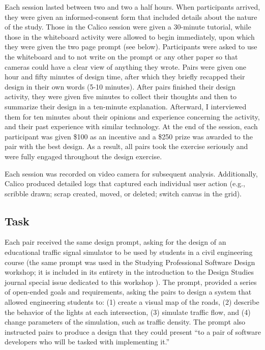 \documentclass[12pt,fleqn]{ucithesis}
\begin{document}
Each session lasted between two and two a half hours. When participants arrived, they were given an informed-consent form that included details about the nature of the study. Those in the Calico session were given a 30-minute tutorial, while those in the whiteboard activity were allowed to begin immediately, upon which they were given the two page prompt (see below). Participants were asked to use the whiteboard and to not write on the prompt or any other paper so that cameras could have a clear view of anything they wrote. Pairs were given one hour and fifty minutes of design time, after which they briefly recapped their design in their own words (5-10 minutes). After pairs finished their design activity, they were given five minutes to collect their thoughts and then to summarize their design in a ten-minute explanation. Afterward, I interviewed them for ten minutes about their opinions and experience concerning the activity, and their past experience with similar technology. At the end of the session, each participant was given \$100 as an incentive and a \$250 prize was awarded to the pair with the best design. As a result, all pairs took the exercise seriously and were fully engaged throughout the design exercise. 

Each session was recorded on video camera for subsequent analysis. Additionally, Calico produced detailed logs that captured each individual user action (e.g., scribble drawn; scrap created, moved, or deleted; switch canvas in the grid).

\subsection {Task}
\label{experimentaldesign:3}

Each pair received the same design prompt, asking for the design of an educational traffic signal simulator to be used by students in a civil engineering course (the same prompt was used in the Studying Professional Software Design workshop; it is included in its entirety in the introduction to the Design Studies journal special issue dedicated to this workshop \citep{Petreb}). The prompt, provided a series of open-ended goals and requirements, asking the pairs to design a system that allowed engineering students to: (1) create a visual map of the roads, (2) describe the behavior of the lights at each intersection, (3) simulate traffic flow, and (4) change parameters of the simulation, such as traffic density. The prompt also instructed pairs to produce a design that they could present ``to a pair of software developers who will be tasked with implementing it.'' 
\end{document}
